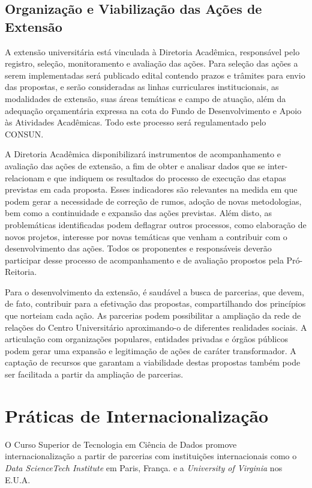 \documentclass[a4paper, 12pt, openright, oneside, german, french, english, brazil]{abntex2}
\begin{document}
\section{Organização e Viabilização das Ações de Extensão}

A extensão universitária está vinculada à Diretoria Acadêmica, responsável pelo registro, seleção, monitoramento e avaliação das ações. Para seleção das ações a serem implementadas será publicado edital contendo prazos e trâmites para envio das propostas, e serão consideradas as linhas curriculares institucionais, as modalidades de extensão, suas áreas temáticas e campo de atuação, além da adequação orçamentária expressa na cota do Fundo de Desenvolvimento e Apoio às Atividades Acadêmicas. Todo este processo será regulamentado pelo CONSUN.

A Diretoria Acadêmica disponibilizará instrumentos de acompanhamento e avaliação das ações de extensão, a fim de obter e analisar dados que se inter-relacionam e que indiquem os resultados do processo de execução das etapas previstas em cada proposta. Esses indicadores são relevantes na medida em que podem gerar a necessidade de correção de rumos, adoção de novas metodologias, bem como a continuidade e expansão das ações previstas. Além disto, as problemáticas identificadas podem deflagrar outros processos, como elaboração de novos projetos, interesse por novas temáticas que venham a contribuir com o desenvolvimento das ações. Todos os proponentes e responsáveis deverão participar desse processo de acompanhamento e de avaliação propostos pela Pró-Reitoria.

Para o desenvolvimento da extensão, é saudável a busca de parcerias, que devem, de fato, contribuir para a efetivação das propostas, compartilhando dos princípios que norteiam cada ação. As parcerias podem possibilitar a ampliação da rede de relações do Centro Universitário aproximando-o de diferentes realidades sociais. A articulação com organizações populares, entidades privadas e órgãos públicos podem gerar uma expansão e legitimação de ações de caráter transformador. A captação de recursos que garantam a viabilidade destas propostas também pode ser facilitada a partir da ampliação de parcerias.

\chapter{Práticas de Internacionalização}

O Curso Superior de Tecnologia em Ciência de Dados promove internacionalização a partir de parcerias com instituições internacionais como o \textit{Data ScienceTech Institute} em Paris, França. e a \textit{University of Virginia} nos E.U.A.
\end{document}
